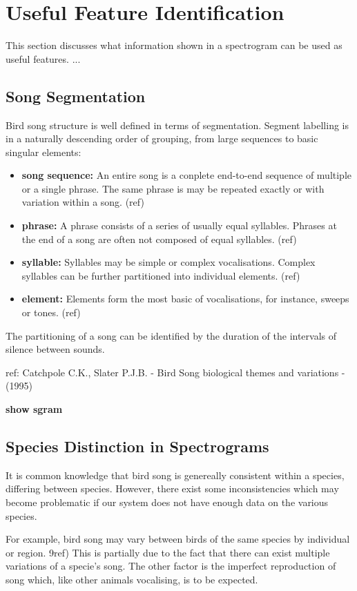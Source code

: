 \section{Useful Feature Identification}
This section discusses what information shown in a spectrogram can be used as
useful features. ...

\subsection{Song Segmentation}
Bird song structure is well defined in terms of segmentation.
Segment labelling is in a naturally descending order of grouping, from
large sequences to basic singular elements:
\begin{itemize}
  \item \textbf{song sequence:}
    An entire song is a conplete end-to-end sequence of multiple or a single
    phrase.
    The same phrase is may be repeated exactly or with variation within a
    song. (ref)
  \item \textbf{phrase:}
    A phrase consists of a series of usually equal syllables.
    Phrases at the end of a song are often not composed of equal syllables. (ref)
  \item \textbf{syllable:}
    Syllables may be simple or complex vocalisations.
    Complex syllables can be further partitioned into individual elements. (ref)
  \item \textbf{element:}
    Elements form the most basic of vocalisations, for instance, sweeps or tones. (ref)
\end{itemize}

The partitioning of a song can be identified by the duration of the intervals
of silence between sounds.

ref: Catchpole C.K., Slater P.J.B. - Bird Song biological themes and variations - (1995)

\textbf{show sgram}

\subsection{Species Distinction in Spectrograms}
It is common knowledge that bird song is genereally consistent within a species,
differing between species.
However, there exist some inconsistencies which may become problematic if our
system does not have enough data on the various species.

For example, bird song may vary between birds of the same species by individual
or region. 9ref)
This is partially due to the fact that there can exist multiple variations of a
specie's song.
The other factor is the imperfect reproduction of song which, like other animals
vocalising, is to be expected.

